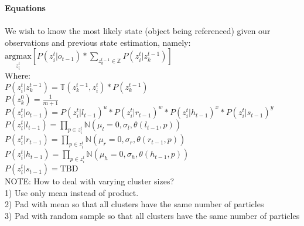 \documentclass[12pt,letterpaper]{article}
\begin{document}
\textbf{Equations}\\\\
We wish to know the most likely state (object being referenced) given our observations and previous state estimation, namely:\\
$\underset{z^t_i}{\text{argmax}}[P(z^t_i | o_{t-1})*\displaystyle\sum_{z^{t-1}_k \in \mathbb{Z}} P(z^t_i|z^{t-1}_k)] $\\
Where:\\
$P(z^t_i | z^{t-1}_k) = \mathbb{T}(z^{t-1}_k, z^t_i)*P(z^{t-1}_k)$\\
$P(z^0_k) = \frac{1}{m+1}$\\
$P(z^t_i|o_{t-1}) = P(z^t_i|l_{t-1})^u*P(z^t_i|r_{t-1})^w*P(z^t_i|h_{t-1})^x*P(z^t_i|s_{t-1})^y$\\
$P(z^t_i|l_{t-1}) = \displaystyle \prod_{p \in z^t_i} \mathbb{N}(\mu_l=0, \sigma_l, \theta(l_{t-1}, p))$\\
$P(z^t_i|r_{t-1})=\displaystyle \prod_{p \in z^t_i} \mathbb{N}(\mu_r=0, \sigma_r, \theta(r_{t-1}, p))$\\
$P(z^t_i|h_{t-1}) =\displaystyle \prod_{p \in z^t_i} \mathbb{N}(\mu_h=0, \sigma_h, \theta(h_{t-1}, p))$\\
$P(z^t_i|s_{t-1}) = \text{TBD}$\\
NOTE: How to deal with varying cluster sizes?\\
1) Use only mean instead of product.\\
2) Pad with mean so that all clusters have the same number of particles\\
3) Pad with random sample so that all clusters have the same number of particles
\end{document}
